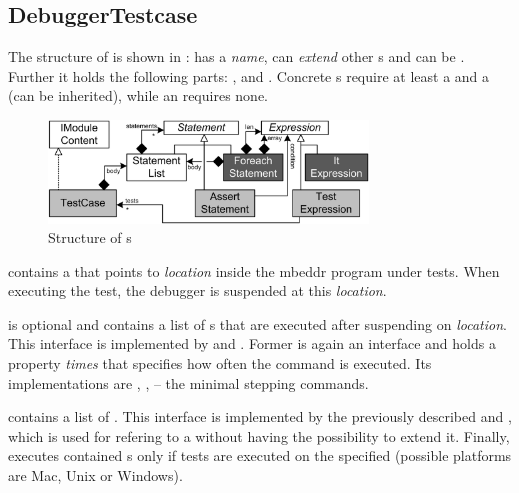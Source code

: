 \subsection{DebuggerTestcase}

The structure of  is shown in
:
has a \emph{name}, can \emph{extend} other s and can be
. Further it holds the following parts:
,  and
. Concrete s require at least  
a  and a  (can be inherited),
while an   requires none.
 
\begin{figure}[h]
  \vspace{-2mm}
  \centering
    \includegraphics[width=8.5cm]{./figures/umldiag.png} 
    \vspace{-2mm}
    \caption{Structure of s}
  \label{fig:DebuggerTestcaseStructure}
  \vspace{-2mm}
\end{figure}

 contains a  that points to
\emph{location} inside the mbeddr program under tests. When executing the test,
the debugger is suspended at this \emph{location}. 

 is optional and contains a
list of s that are executed after suspending on
\emph{location}. This interface is implemented by 
 and . Former is again an
interface and holds a property \emph{times} that specifies how often the command
is executed. Its implementations are ,
,  -- the minimal stepping commands.

 contains a list of . This
interface is implemented by the previously described 
and , which is used for refering to a
 without having the possibility to extend it.
Finally,  executes contained s only if tests
are executed on the specified  (possible platforms are Mac, Unix or
Windows).


